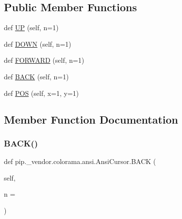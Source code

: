 \subsection*{Public Member Functions}
\begin{DoxyCompactItemize}
\item 
def \hyperlink{classpip_1_1__vendor_1_1colorama_1_1ansi_1_1AnsiCursor_a4d915d8f1f253574e90355dd9d10a2fb}{UP} (self, n=1)
\item 
def \hyperlink{classpip_1_1__vendor_1_1colorama_1_1ansi_1_1AnsiCursor_a5959597f61e2f71b44a3eefcb8071c65}{D\+O\+WN} (self, n=1)
\item 
def \hyperlink{classpip_1_1__vendor_1_1colorama_1_1ansi_1_1AnsiCursor_a2882f36033ff2588905395b0ab2b6e60}{F\+O\+R\+W\+A\+RD} (self, n=1)
\item 
def \hyperlink{classpip_1_1__vendor_1_1colorama_1_1ansi_1_1AnsiCursor_a48d838daae700bf6e05239f789dc51dc}{B\+A\+CK} (self, n=1)
\item 
def \hyperlink{classpip_1_1__vendor_1_1colorama_1_1ansi_1_1AnsiCursor_aa436e63233cbf19440140ff61d39bdcf}{P\+OS} (self, x=1, y=1)
\end{DoxyCompactItemize}


\subsection{Member Function Documentation}
\mbox{\label{classpip_1_1__vendor_1_1colorama_1_1ansi_1_1AnsiCursor_a48d838daae700bf6e05239f789dc51dc}} 
\subsubsection{\texorpdfstring{B\+A\+C\+K()}{BACK()}}
{\footnotesize\ttfamily def pip.\+\_\+vendor.\+colorama.\+ansi.\+Ansi\+Cursor.\+B\+A\+CK (\begin{DoxyParamCaption}\item[{}]{self,  }\item[{}]{n = {} }\end{DoxyParamCaption})}

\mbox{\label{classpip_1_1__vendor_1_1colorama_1_1ansi_1_1AnsiCursor_a5959597f61e2f71b44a3eefcb8071c65}} 
